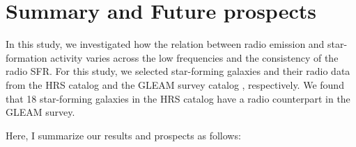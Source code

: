 \chapter{Summary and Future prospects}\label{chap:summary}
%
%

In this study, we investigated how the relation between radio emission and star-formation activity varies across the low frequencies and the consistency of the radio SFR\@.
For this study, we selected star-forming galaxies and their radio data from the HRS catalog \citep{Boselli2010} and the GLEAM survey catalog \citep{Hurley-Walker2017a}, respectively. We found that 18 star-forming galaxies in the HRS catalog have a radio counterpart in the GLEAM survey.

Here, I summarize our results and prospects as follows:

